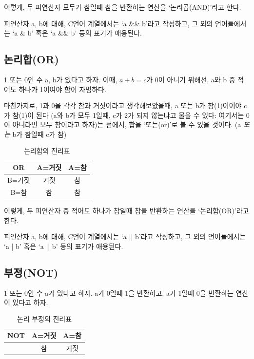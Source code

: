 \documentclass[a4paper,12pt]{book}
\begin{document}
\begin{appendices}
이렇게, 두 피연산자 모두가 참일때 참을 반환하는 연산을 `논리곱(AND)'라고 한다.

피연산자 a, b에 대해, C언어 계열에서는 `a \&\& b'라고 작성하고,
그 외의 언어들에서는 `a \& b' 혹은 `a \&\& b' 등의 표기가 애용된다.

\subsection{논리합(OR)}

1 또는 0인 수 a, b가 있다고 하자.
이때, $a + b = c$가 0이 아니기 위해선,
a와 b 중 적어도 하나가 1이여야 함이 자명하다.

마찬가지로, 1과 0을 각각 참과 거짓이라고 생각해보았을때,
a 또는 b가 참(1)이어야 c가 참(1)이 된다
(a와 b가 모두 1일때, c가 2가 되지 않는냐고 물을 수 있다:
여기서는 0이 아니라면 모두 참이라고 하자)는 점에서,
합을 `또는(or)'로 볼 수 있을 것이다.
({a \textit{또는} b}가 참일때 c가 참)

\begin{table}[H]
    \centering

    \caption{논리합의 진리표}

    \begin{tabular}{ || c || c | c || }
        \hline
        OR    & A=거짓 & A=참 \\
        \hline\hline
        B=거짓 &   거짓 &   참 \\
        \hline
        B=참   &    참 &   참 \\
        \hline
    \end{tabular}
\end{table}

이렇게, 두 피연산자 중 적어도 하나가 참일때 참을 반환하는 연산을 `논리합(OR)'라고 한다.

피연산자 a, b에 대해, C언어 계열에서는 `a || b'라고 작성하고,
그 외의 언어들에서는 `a | b' 혹은 `a || b' 등의 표기가 애용된다.

\subsection{부정(NOT)}

1 또는 0인 수 a가 있다고 하자.
a가 0일때 1을 반환하고,
a가 1일때 0을 반환하는 연산이 있다고 하자.

\begin{table}[H]
    \centering

    \caption{논리 부정의 진리표}

    \begin{tabular}{ || c || c | c || }
        \hline
        NOT & A=거짓 & A=참 \\
        \hline\hline
            &     참 & 거짓 \\
        \hline
    \end{tabular}
\end{table}


\end{appendices}
\end{document}
